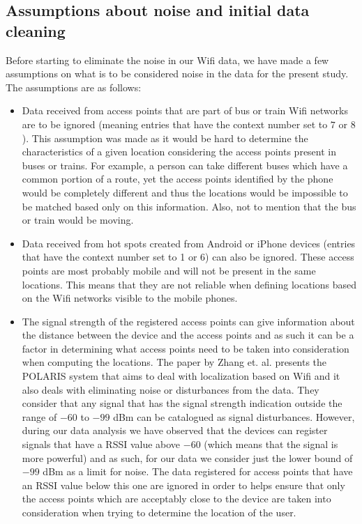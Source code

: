 \subsection{Assumptions about noise and initial data cleaning}
\label{noise_assumptions}
Before starting to eliminate the noise in our Wifi data, we have made a
few assumptions on what is to be considered noise in the data for the present
study. The assumptions are as follows:
\begin{itemize}
  \item Data received from access points that are part of bus or train Wifi
  networks are to be ignored (meaning entries that have the context number set
  to $7$ or $8$). This assumption was made as it would be hard to determine the
  characteristics of a given location considering the access points present in
  buses or trains. For example, a person can take different buses which have a
  common portion of a route, yet the access points identified by the phone would
  be completely different and thus the locations would be impossible to be
  matched based only on this information. Also, not to mention that the bus or
  train would be moving.
  \item Data received from hot spots created from Android or iPhone devices
  (entries that have the context number set to 1 or 6) can also be ignored.
  These access points are most probably mobile and will not be present in the
  same locations. This means that they are not reliable when defining locations
  based on the Wifi networks visible to the mobile phones.
  \item The signal strength of the registered access points can give
  information about the distance between the device and the access points and
  as such it can be a factor in determining what access points need to be
  taken into consideration when computing the locations. The paper by Zhang
  et. al. \cite{zhang2012polaris} presents the POLARIS system that aims to deal
  with localization based on Wifi and it also deals with eliminating noise or
  disturbances from the data. They consider that any signal that has the signal
  strength indication outside the range of $-60$ to $-99$ dBm can be catalogued
  as signal disturbances. However, during our data analysis we have observed that
  the devices can register signals that have a RSSI value above $-60$ (which
  means that the signal is more powerful) and as such, for our data we
  consider just the lower bound of $-99$ dBm as a limit for noise. The data
  registered for access points that have an RSSI value below this one are
  ignored in order to helps ensure that only the access points which are
  acceptably close to the device are taken into consideration when trying to
  determine the location of the user.
\end{itemize}

